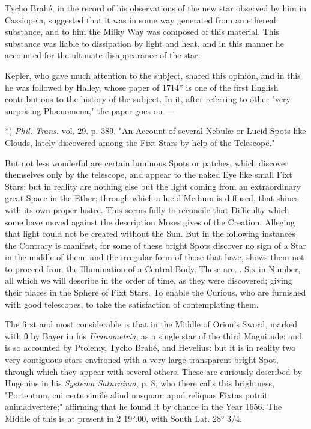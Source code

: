 \documentclass[a4paper, 12pt, oneside, polutonikogreek, english]{article}
\begin{document}
Tycho Brahé, in the record of his observations of the new star observed by him in Cassiopeia, suggested that it was in some way generated from an ethereal substance, and to him the Milky Way was composed of this material. This substance was liable to dissipation by light and heat, and in this manner he accounted for the ultimate disappearance of the star.

Kepler, who gave much attention to the subject, shared this opinion, and in this he was followed by Halley, whose paper of 1714* is one of the first English contributions to the history of the subject. In it, after referring to other "very surprising Phænomena," the paper goes on ---

*) \emph{Phil. Trans.} vol. 29. p. 389. "An Account of several Nebulæ or Lucid Spots like Clouds, lately discovered among the Fixt Stars by help of the Telescope."

But not less wonderful are certain luminous Spots or patches, which discover themselves only by the telescope, and appear to the naked Eye like small Fixt Stars; but in reality are nothing else but the light coming from an extraordinary great Space in the Ether; through which a lucid Medium is diffused, that shines with its own proper lustre. This seems fully to reconcile that Difficulty which some have moved against the description Moses gives of the Creation. Alleging that light could not be created without the Sun. But in the following instances the Contrary is manifest, for some of these bright Spots discover no sign of a Star in the middle of them; and the irregular form of those that have, shows them not to proceed from the Illumination of a Central Body. These are... Six in Number, all which we will describe in the order of time, as they were discovered; giving their places in the Sphere of Fixt Stars. To enable the Curious, who are furnished with good telescopes, to take the satisfaction of contemplating them.

The first and most considerable is that in the Middle of Orion's Sword, marked with θ by Bayer in his \emph{Uranometria}, as a single star of the third Magnitude; and is so accounted by Ptolemy, Tycho Brahé, and Hevelius: but it is in reality two very contiguous stars environed with a very large transparent bright Spot, through which they appear with several others. These are curiously described by Hugenius in his \emph{Systema Saturnium}, p. 8, who there calls this brightness, "Portentum, cui certe simile aliud nusquam apud reliquas Fixtas potuit animadvertere;" affirming that he found it by chance in the Year 1656. The Middle of this is at present in 2 19°.00, with South Lat. 28° 3/4.
\end{document}
